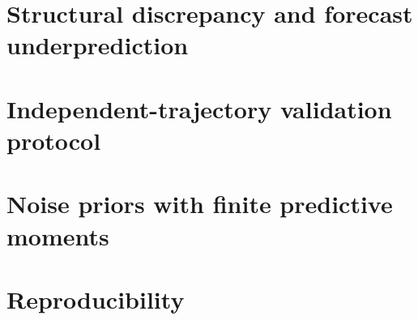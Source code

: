 \documentclass[11pt]{amsart}
\begin{document}
    \section{Structural discrepancy and forecast underprediction}
        
    \clearpage
    \section{Independent-trajectory validation protocol}
        
    \clearpage
    \section{Noise priors with finite predictive moments}
        
    \clearpage
    \section{Reproducibility}
        


\begingroup\small\raggedright

\endgroup
\end{document}
